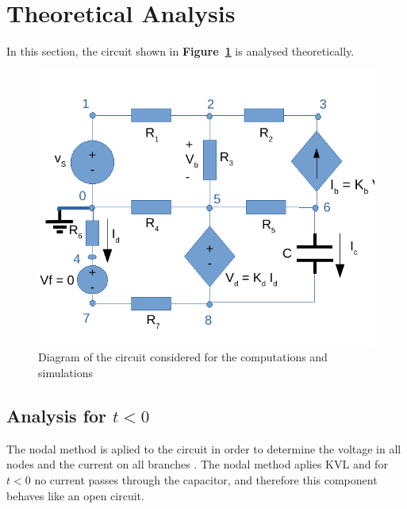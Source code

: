 \section{Theoretical Analysis}
\label{sec:analysis}

In this section, the circuit shown in \textbf{Figure~\ref{fig:diagram_t2}} is analysed
theoretically.
\begin{figure}[H] \centering
\includegraphics[width=0.6\linewidth]{diagram_t2.pdf}
\caption{Diagram of the circuit considered for the computations and simulations}
\label{fig:diagram_t2}
\end{figure}

\subsection{Analysis for $t<0$} 
The nodal method is aplied to the circuit in order to determine the voltage in all nodes and the current on all branches . The nodal method aplies KVL and for $t<0$ no current passes through the capacitor, and therefore this component behaves like an open circuit.

